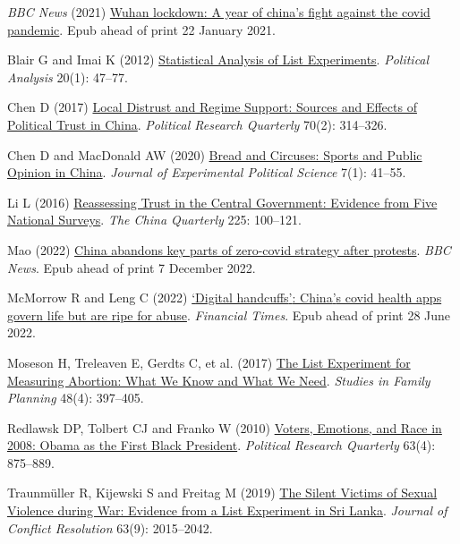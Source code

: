 \documentclass[
  letterpaper,
  DIV=11,
  numbers=noendperiod]{scrartcl}
\newlength{\cslhangindent}
\newlength{\cslentryspacingunit} %
\newenvironment{CSLReferences}[2] %
 {%
  \setlength{\parindent}{0pt}
  \ifodd #1
  \let\oldpar\par
  \def\par{\hangindent=\cslhangindent\oldpar}
  \fi
  \setlength{\parskip}{#2\cslentryspacingunit}
 }%
 {}
\begin{document}
\hypertarget{refs}{}
\begin{CSLReferences}{1}{0}
\leavevmode{}%
\emph{BBC News} (2021)
\href{https://www.bbc.com/news/world-asia-china-55628488}{Wuhan
lockdown: A year of china's fight against the covid pandemic}. Epub
ahead of print 22 January 2021.

\leavevmode{}%
Blair G and Imai K (2012)
\href{https://doi.org/10.1093/pan/mpr048}{Statistical Analysis of List
Experiments}. \emph{Political Analysis} 20(1): 47--77.

\leavevmode{}%
Chen D (2017) \href{https://doi.org/10.1177/1065912917691360}{Local
Distrust and Regime Support: Sources and Effects of Political Trust in
China}. \emph{Political Research Quarterly} 70(2): 314--326.

\leavevmode{}%
Chen D and MacDonald AW (2020)
\href{https://doi.org/10.1017/XPS.2019.15}{Bread and Circuses: Sports
and Public Opinion in China}. \emph{Journal of Experimental Political
Science} 7(1): 41--55.

\leavevmode{}%
Li L (2016) \href{https://doi.org/10.1017/S0305741015001629}{Reassessing
Trust in the Central Government: Evidence from Five National Surveys}.
\emph{The China Quarterly} 225: 100--121.

\leavevmode{}%
Mao (2022)
\href{https://www.bbc.com/news/world-asia-china-63855508}{China abandons
key parts of zero-covid strategy after protests}. \emph{BBC News}. Epub
ahead of print 7 December 2022.

\leavevmode{}%
McMorrow R and Leng C (2022)
\href{https://www.ft.com/content/dee6bcc6-3fc5-4edc-814d-46dc73e67c7e}{{`}Digital
handcuffs{'}: China{'}s covid health apps govern life but are ripe for
abuse}. \emph{Financial Times}. Epub ahead of print 28 June 2022.

\leavevmode{}%
Moseson H, Treleaven E, Gerdts C, et al. (2017)
\href{https://doi.org/10.1111/sifp.12042}{The List Experiment for
Measuring Abortion: What We Know and What We Need}. \emph{Studies in
Family Planning} 48(4): 397--405.

\leavevmode{}%
Redlawsk DP, Tolbert CJ and Franko W (2010)
\href{https://doi.org/10.1177/1065912910373554}{Voters, Emotions, and
Race in 2008: Obama as the First Black President}. \emph{Political
Research Quarterly} 63(4): 875--889.

\leavevmode{}%
Traunmüller R, Kijewski S and Freitag M (2019)
\href{https://doi.org/10.1177/0022002719828053}{The Silent Victims of
Sexual Violence during War: Evidence from a List Experiment in Sri
Lanka}. \emph{Journal of Conflict Resolution} 63(9): 2015--2042.

\end{CSLReferences}
\end{document}

